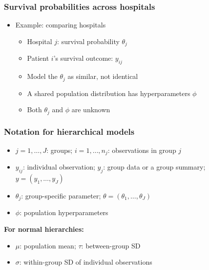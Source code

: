 \documentclass[10pt]{beamer}
\begin{document}
\begin{frame}

\frametitle{Survival probabilities across hospitals}

  \begin{itemize}
  \item Example: comparing hospitals
    \begin{itemize}
    \item Hospital $j$: survival probability $\theta_j$
    \item Patient $i$'s survival outcome: $y_{ij}$\\[1mm]
        \begin{xy}
        \end{xy}
        \pause
      \item Model the $\theta_j$ as similar, not identical\\[1mm]
        \begin{xy}
        \end{xy}
      \item A shared population distribution has hyperparameters $\phi$
      \item Both $\theta_j$ and $\phi$ are unknown
    \end{itemize}
  \end{itemize}
\end{frame}

\begin{frame}
\frametitle{Notation for hierarchical models}

  \begin{itemize}
  \item $j=1,\ldots,J$: groups; $i=1,\ldots,n_j$: observations in group $j$
  \item $y_{ij}$: individual observation; $y_j$: group data or a group summary;
    $y=(y_1,\ldots,y_J)$
  \item $\theta_j$: group-specific parameter;
    $\theta=(\theta_1,\ldots,\theta_J)$
  \item $\phi$: population hyperparameters
  \end{itemize}
  \medskip
  \textbf{For normal hierarchies:}
  \begin{itemize}
  \item $\mu$: population mean; $\tau$: between-group SD
  \item $\sigma$: within-group SD of individual observations
  \end{itemize}
\end{frame}
\end{document}
